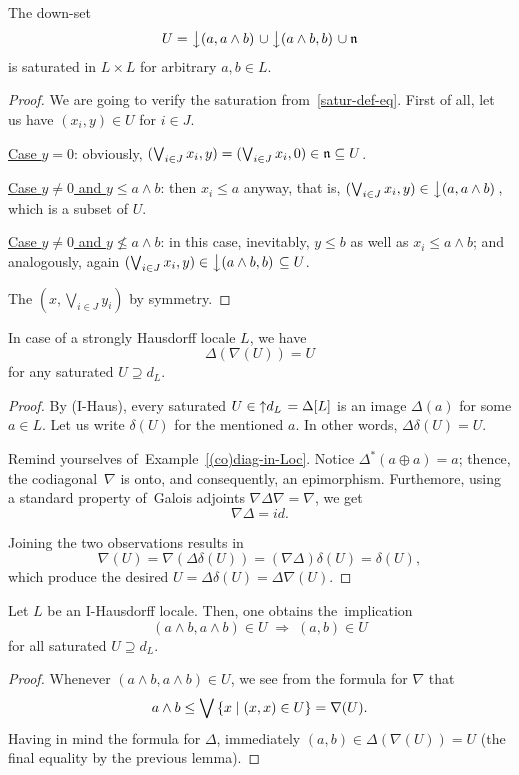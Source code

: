 \begin{lem} \label{downsets-satur}
  The down-set
  \[
    U = \left\downarrow(a, a \wedge b)\right. \cup \left\downarrow(a \wedge b, b)\right. \cup \mathfrak{n}
  \]
  is saturated in $L \times L$ for arbitrary $a, b\in L$.
\end{lem}
\begin{proof}
  We are going to verify the saturation from~\ref{satur-def-eq}\thinspace.
  First of all, let us have $(x_i, y)\in U$ for $i\in J$.

  \underline{Case $y = 0$}:
  obviously, $(\bigvee_{i\in J} x_i, y) = (\bigvee_{i\in J} x_i, 0)\in \mathfrak{n}
  \subseteq U$.

  \underline{Case $y \ne 0$ and $y \leq a \wedge b$}:
  then $x_i \leq a$ anyway, that is, $(\bigvee_{i\in J} x_i, y) \in
  \left\downarrow(a, a \wedge b)\right.$, which is a subset of $U$.

  \underline{Case $y \ne 0$ and $y \not\leq a \wedge b$}:
  in this case, inevitably, $y \leq b$ as well as $x_i \leq a \wedge b$; and
  analogously, again $(\bigvee_{i\in J} x_i, y) \in \left\downarrow(a \wedge b,
  b)\right. \subseteq U$.

  The $(x, \bigvee_{i\in J} y_i)$ by symmetry.
\end{proof}

\begin{lem} \label{meets-in-satur}
  In case of a strongly Hausdorff locale $L$, we have
  \[
    \Delta(\nabla(U)) = U
  \]
  for any saturated $U \supseteq d_L$.
\end{lem}
\begin{proof}
  By (I-Haus), every saturated $U\in \left\uparrow d_L \right. = \Delta[L]$ is an image
  $\Delta(a)$ for some $a\in L$.
  Let us write $\delta(U)$ for the mentioned $a$.
  In other words, $\Delta\delta(U) = U$.

  Remind yourselves of~Example~\ref{(co)diag-in-Loc}\thinspace.
  Notice $\Delta^*(a \oplus a) = a$;
  thence, the codiagonal~$\nabla$ is onto, and consequently, an epimorphism.
  Furthemore, using a standard property of~Galois adjoints $\nabla \Delta
  \nabla = \nabla$,
  we get
  \[
    \nabla \Delta = id.
  \]

  Joining the two observations results in
  \[
    \nabla (U) = \nabla (\Delta\delta (U)) = (\nabla \Delta)\delta (U) = \delta(U),
  \]
  which produce the desired $U = \Delta \delta (U) = \Delta \nabla (U)$.
\end{proof}

\begin{lem} \label{meets-in-satur}
  Let $L$ be an I-Hausdorff locale.
  Then, one obtains the~implication
  \[
    \left( a \wedge b, a \wedge b \right) \in U
    \; \Rightarrow \;
    \left( a, b \right) \in U
  \]
  for all saturated $U \supseteq d_L$.
\end{lem}
\begin{proof}
  Whenever $(a \wedge b, a \wedge b)\in U$, we see from the formula for
  $\nabla$ that
  \[
    a \wedge b \leq \bigvee \left\{ x \mid (x, x) \in U \right\} = \nabla(U).
  \]
  Having in mind the formula for $\Delta$, immediately $(a, b) \in \Delta( \nabla(U) ) = U$
  (the final equality by the previous lemma).
\end{proof}

